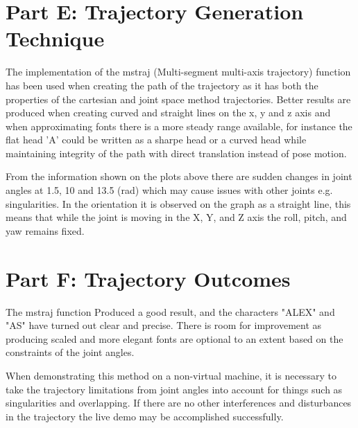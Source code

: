 \documentclass[a4paper, 10pt]{article}
\begin{document}
\section{Part E: Trajectory Generation Technique}

The implementation of the mstraj (Multi-segment multi-axis trajectory) function has been used when creating the path of the trajectory as it has both the properties of the cartesian and joint space method trajectories. Better results are produced when creating curved and straight lines on the x, y and z axis and when approximating fonts there is a more steady range available, for instance the flat head 'A' could be written as a sharpe head or a curved head while maintaining integrity of the path with direct translation instead of pose motion. 

From the information shown on the plots above there are sudden changes in joint angles at 1.5, 10 and 13.5 (rad) which may cause issues with other joints e.g. singularities. In the orientation it is observed on the graph as a straight line, this means that while the joint is moving in the X, Y, and Z axis the roll, pitch, and yaw remains fixed.



\section{Part F: Trajectory Outcomes}

The mstraj function Produced a good result, and the characters "ALEX" and "AS" have turned out clear and precise. There is room for improvement as producing scaled and more elegant fonts are optional to an extent based on the constraints of the joint angles. 

When demonstrating this method on a non-virtual machine, it is necessary to take the trajectory limitations from joint angles into account for things such as singularities and overlapping. If there are no other interferences and disturbances in the trajectory the live demo may be accomplished successfully.

\end{document}
